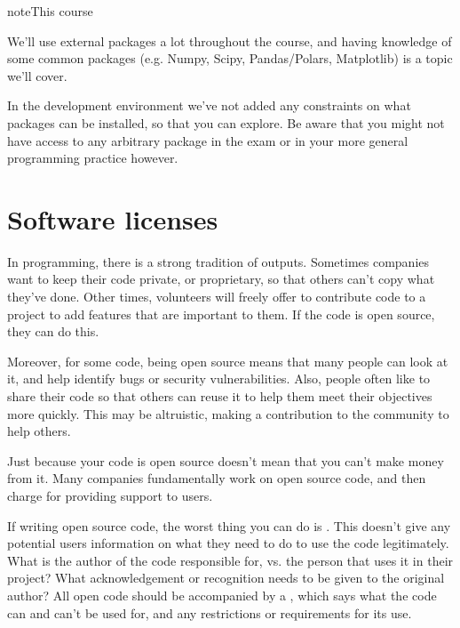 \documentclass[letterpaper,10pt,british]{sphinxmanual}
\begin{document}
\begin{sphinxadmonition}{note}{This course}

\sphinxAtStartPar
We’ll use external packages a lot throughout the course, and having knowledge of some common packages (e.g. Numpy, Scipy, Pandas/Polars, Matplotlib) is a topic we’ll cover.

\sphinxAtStartPar
In the development environment we’ve not added any constraints on what packages can be installed, so that you can explore. Be aware that you might not have access to any arbitrary package in the exam or in your more general programming practice however.
\end{sphinxadmonition}

\sphinxstepscope


\section{Software licenses}
\label{\detokenize{chapters/software_development_tools/licensing:software-licenses}}\label{\detokenize{chapters/software_development_tools/licensing:id1}}\label{\detokenize{chapters/software_development_tools/licensing::doc}}
\sphinxAtStartPar
In programming, there is a strong tradition of  outputs. Sometimes companies want to keep their code private, or proprietary, so that others can’t copy what they’ve done. Other times, volunteers will freely offer to contribute code to a project to add features that are important to them. If the code is open source, they can do this.

\sphinxAtStartPar
Moreover, for some code, being open source means that many people can look at it, and help identify bugs or security vulnerabilities. Also, people often like to share their code so that others can re\sphinxhyphen{}use it to help them meet their objectives more quickly. This may be altruistic, making a contribution to the community to help others.

\sphinxAtStartPar
Just because your code is open source doesn’t mean that you can’t make money from it. Many companies fundamentally work on open source code, and then charge for providing support to users.

\sphinxAtStartPar
If writing open source code, the worst thing you can do is . This doesn’t give any potential users information on what they need to do to use the code legitimately. What is the author of the code responsible for, vs. the person that uses it in their project? What acknowledgement or recognition needs to be given to the original author? All open code should be accompanied by a , which says what the code can and can’t be used for, and any restrictions or requirements for its use.
\end{document}
